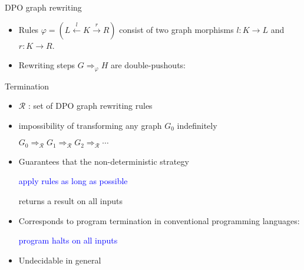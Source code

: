 \documentclass{beamer}
\begin{document}
\begin{frame}{DPO graph rewriting}
\begin{adjustwidth}{-0.5cm}{0cm}
\begin{itemize}
      \item Rules $\varphi = (L \overset{l}{\leftarrow} K \overset{r}{\rightarrow} R)$ consist of two graph morphisms $l: K \to L$ and $r: K \to R$.
      \item Rewriting steps $G \Rightarrow_\varphi H$ are double-pushouts:
         \begin{center}
      \end{center}
  \end{itemize} 
\end{adjustwidth}
\end{frame} 

\begin{frame}{Termination~\cite{plump2018modular}}
  \begin{itemize}
    \item $\mathcal{R}$ : set of DPO graph rewriting rules
    \item impossibility of transforming any graph $G_0$ indefinitely
      \begin{center}
        $G_0 \Rightarrow_\mathcal{R} G_1 \Rightarrow_\mathcal{R} G_2 \Rightarrow_\mathcal{R} \cdots$
      \end{center}
    \item Guarantees that the non-deterministic strategy
          \begin{center}
              \textcolor{blue}{apply rules as long as possible}
          \end{center}
          returns a result on all inputs
    \item Corresponds to program termination in conventional programming languages:
          \begin{center}
            \textcolor{blue}{program halts on all inputs}
          \end{center}
    \item Undecidable in general
  \end{itemize}
\end{frame}
\end{document}
